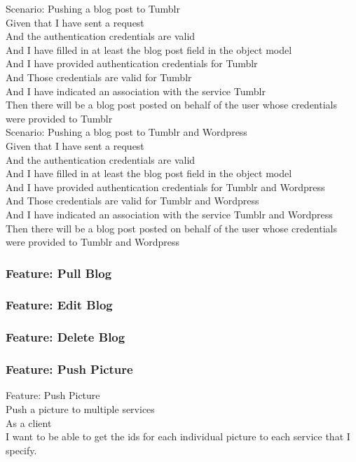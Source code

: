 \documentclass[12pt]{article}
\begin{document}
Scenario: Pushing a blog post to Tumblr \\
	Given that I have sent a request \\
	And the authentication credentials are valid \\
	And I have filled in at least the blog post field in the object model \\
	And I have provided authentication credentials for Tumblr \\ 
	And Those credentials are valid for Tumblr \\ 
	And I have indicated an association with the service Tumblr \\
	Then there will be a blog post posted on behalf of the user whose credentials 
	were provided to Tumblr \\

Scenario: Pushing a blog post to Tumblr and Wordpress \\
	Given that I have sent a request \\
	And the authentication credentials are valid \\
	And I have filled in at least the blog post field in the object model \\
	And I have provided authentication credentials for Tumblr and Wordpress \\ 
	And Those credentials are valid for Tumblr and Wordpress \\ 
	And I have indicated an association with the service Tumblr and Wordpress \\
	Then there will be a blog post posted on behalf of the user whose credentials 
	were provided to Tumblr and Wordpress \\

\subsubsection{Feature: Pull Blog}
\subsubsection{Feature: Edit Blog}
\subsubsection{Feature: Delete Blog}

\subsubsection{Feature: Push Picture}
Feature: Push Picture \\
	Push a picture to multiple services \\
	As a client \\
	I want to be able to get the ids for each individual picture to each  
	service that I specify. \\
	
\end{document}
